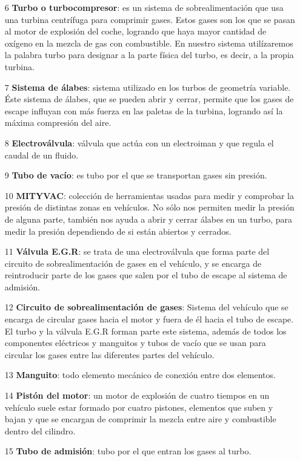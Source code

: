 \documentclass[a4paper,12pt]{article}
\begin{document}
\begin{itemize}
\item[6] \textbf{Turbo o turbocompresor}: es un sistema de sobrealimentación que usa una turbina centrífuga para comprimir gases. Estos gases son los que se pasan al motor de explosión del coche, logrando que haya mayor cantidad de oxígeno en la mezcla de gas con combustible. En nuestro sistema utilízaremos la palabra turbo para designar a la parte física del turbo, es decir, a la propia turbina.
\item[7] \textbf{Sistema de álabes}: sistema utilizado en los turbos de geometría variable. Éste sistema de álabes, que se pueden abrir y cerrar, permite que los gases de escape influyan con más fuerza en las paletas de la turbina, logrando así la máxima compresión del aire.
\item[8] \textbf{Electroválvula}: válvula que actúa con un electroiman y que regula el caudal de un fluido.
\item[9] \textbf{Tubo de vacío}: es tubo por el que se transportan gases sin presión.
\item[10] \textbf{MITYVAC}: colección de herramientas usadas para medir y comprobar la presión de distintas zonas en vehículos. No sólo nos permiten medir la presión de alguna parte, también nos ayuda a abrir y cerrar álabes en un turbo, para medir la presión dependiendo de si están abiertos y cerrados.
\item[11] \textbf{Válvula E.G.R}: se trata de una electroválvula que forma parte del circuito de sobrealimentación de gases en el vehículo, y se encarga de reintroducir parte de los gases que salen por el tubo de escape al sistema de admisión. 
\item[12] \textbf{Circuito de sobrealimentación de gases}: Sistema del vehículo que se encarga de circular gases hacia el motor y fuera de él hacia el tubo de escape. El turbo y la válvula E.G.R forman parte este sistema, además de todos los componentes eléctricos y manguitos y tubos de vacío que se usan para circular los gases entre las diferentes partes del vehículo.
\item[13] \textbf{Manguito}: todo elemento mecánico de conexión entre dos elementos.
\item[14] \textbf{Pistón del motor}: un motor de explosión de cuatro tiempos en un vehículo suele estar formado por cuatro pistones, elementos que suben y bajan y que se encargan de comprimir la mezcla entre aire y combustible dentro del cilindro.
\item[15] \textbf{Tubo de admisión}: tubo por el que entran los gases al turbo.

\end{itemize}
\end{document}
